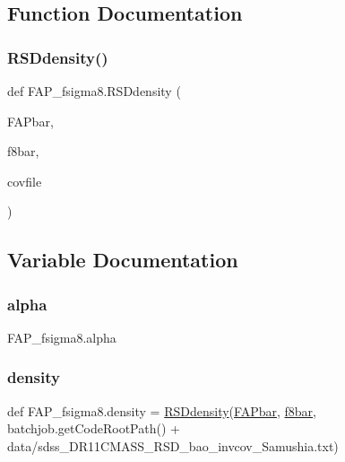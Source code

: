 \subsection{Function Documentation}
\mbox{\label{namespaceFAP__fsigma8_a80cad49915e715358d6cf2af830fb271}} 
\subsubsection{\texorpdfstring{R\+S\+Ddensity()}{RSDdensity()}}
{\footnotesize\ttfamily def F\+A\+P\+\_\+fsigma8.\+R\+S\+Ddensity (\begin{DoxyParamCaption}\item[{}]{F\+A\+Pbar,  }\item[{}]{f8bar,  }\item[{}]{covfile }\end{DoxyParamCaption})}



\subsection{Variable Documentation}
\mbox{\label{namespaceFAP__fsigma8_a4f7e69d33f52bc12ca25a32dda3285c2}} 
\subsubsection{\texorpdfstring{alpha}{alpha}}
{\footnotesize\ttfamily F\+A\+P\+\_\+fsigma8.\+alpha}

\mbox{\label{namespaceFAP__fsigma8_a83cb5d8eaffbd53728890e5d7f6bc10f}} 
\subsubsection{\texorpdfstring{density}{density}}
{\footnotesize\ttfamily def F\+A\+P\+\_\+fsigma8.\+density = \mbox{\hyperlink{namespaceFAP__fsigma8_a80cad49915e715358d6cf2af830fb271}{R\+S\+Ddensity}}(\mbox{\hyperlink{namespaceFAP__fsigma8_a21f75188f94e2d15b133164b044318dd}{F\+A\+Pbar}}, \mbox{\hyperlink{namespaceFAP__fsigma8_aa11ac818be82b0a372ec359695ca6fd8}{f8bar}}, batchjob.\+get\+Code\+Root\+Path() + \textquotesingle{}data/sdss\+\_\+\+D\+R11\+C\+M\+A\+S\+S\+\_\+\+R\+S\+D\+\_\+bao\+\_\+invcov\+\_\+\+Samushia.\+txt\textquotesingle{})}

